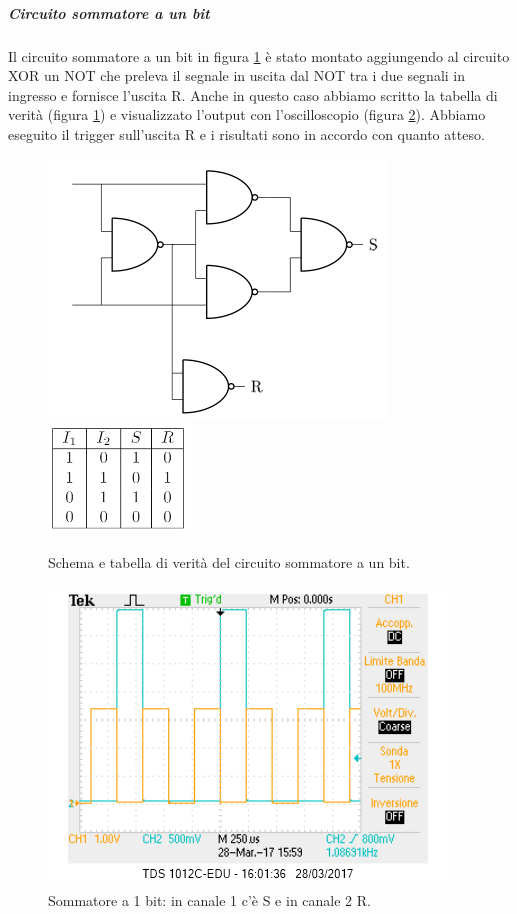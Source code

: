 \documentclass[10pt,a4paper]{article}
\begin{document}
\subparagraph{Circuito sommatore a un bit}
Il circuito sommatore a un bit in figura \ref{fig:sommatore} è stato montato aggiungendo al circuito XOR un NOT che preleva il segnale in uscita dal NOT tra i due segnali in ingresso e fornisce l'uscita R. Anche in questo caso abbiamo scritto la tabella di verità (figura \ref{fig:sommatore}) e visualizzato l'output con l'oscilloscopio (figura \ref{osc:sommatore}). Abbiamo eseguito il trigger sull'uscita R e i risultati sono in accordo con quanto atteso.



\begin{figure}[!htb]
  \centering
  \includegraphics[scale=0.7]{sommatore.png}\includegraphics[scale=0.8]{tabSOMMATORE.png}
\caption{Schema e tabella di verità del circuito sommatore a un bit.\label{fig:sommatore}}
\end{figure}

\begin{figure}[!htb]
  \centering
  \includegraphics[scale=0.75]{sommatoreRS.png}
\caption{Sommatore a 1 bit: in canale 1 c'è S e in canale 2 R.\label{osc:sommatore}}
\end{figure}
\end{document}
